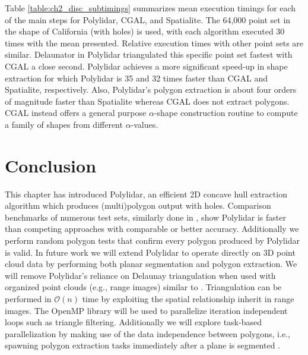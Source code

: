 Table \ref{table:ch2_disc_subtimings} summarizes mean execution timings for each of the main steps for Polylidar, CGAL, and Spatialite. The 64,000 point set in the shape of California (with holes) is used, with each algorithm executed 30 times with the mean presented.  Relative execution times with other point sets are similar.  Delaunator in Polylidar triangulated this specific point set fastest with CGAL a close second. Polylidar achieves a more significant speed-up in shape extraction for which Polylidar is 35 and 32 times faster than CGAL and Spatialite, respectively. Also, Polylidar's polygon extraction is about four orders of magnitude faster than Spatialite whereas CGAL does not extract polygons. CGAL instead offers a general purpose $\alpha$-shape construction routine to compute a family of shapes from different $\alpha$-values. %




\section{Conclusion}\label{sec:ch2_conclusion}

This chapter has introduced Polylidar, an efficient 2D concave hull extraction algorithm which produces (multi)polygon output with holes. Comparison benchmarks of numerous test sets, similarly done in \cite{duckham_efficient_2008}, show Polylidar is faster than competing approaches with comparable or better accuracy. Additionally we perform random polygon tests that confirm every polygon produced by Polylidar is valid. In future work we will extend Polylidar to operate directly on 3D point cloud data by performing both planar segmentation and polygon extraction. We will remove Polylidar's reliance on Delaunay triangulation when used with organized point clouds (e.g., range images) similar to \cite{lee_fast_2013}. Triangulation can be performed in $\mathcal{O}(n)$ time by exploiting the spatial relationship inherit in range images. The OpenMP library will be used to parallelize iteration independent loops such as triangle filtering. Additionally we will explore task-based parallelization by making use of the data independence between polygons, i.e., spawning polygon extraction tasks immediately after a plane is segmented \cite{huang_cpp-taskflow_2019}. 